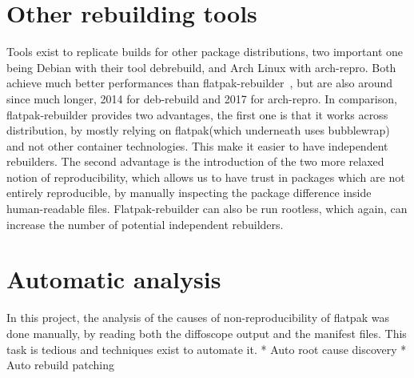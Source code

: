 \documentclass[a4paper,11pt,oneside]{report}
\theoremstyle{definition}
\newcommand{\sysname}{flatpak-rebuilder\xspace}
\newcommand{\Sysname}{Flatpak-rebuilder\xspace}
\newcommand{\fp}{flatpak\xspace}
\begin{document}
\section{Other rebuilding tools}
Tools exist to replicate builds for other package distributions, two important
one being Debian with their tool debrebuild, and Arch Linux with arch-repro.
Both achieve much better performances than \sysname~\cite{debian:repro,
arch-rebuilderd}, but are also around since much longer, 2014 for deb-rebuild
and 2017 for arch-repro. In comparison, \sysname provides two advantages, the
first one is that it works across distribution, by mostly relying on \fp (which
underneath uses bubblewrap) and not other container technologies. This make it
easier to have independent rebuilders. The second advantage is the introduction
of the two more relaxed notion of reproducibility, which allows us to have
trust in packages which are not entirely reproducible, by manually inspecting
the package difference inside human-readable files. \Sysname can also be run
rootless, which again, can increase the number of potential independent
rebuilders.

\section{Automatic analysis}
In this project, the analysis of the causes of non-reproducibility of \fp was
done manually, by reading both the diffoscope output and the manifest files.
This task is tedious and techniques exist to automate it.
* Auto root cause discovery
* Auto rebuild patching
\end{document}
